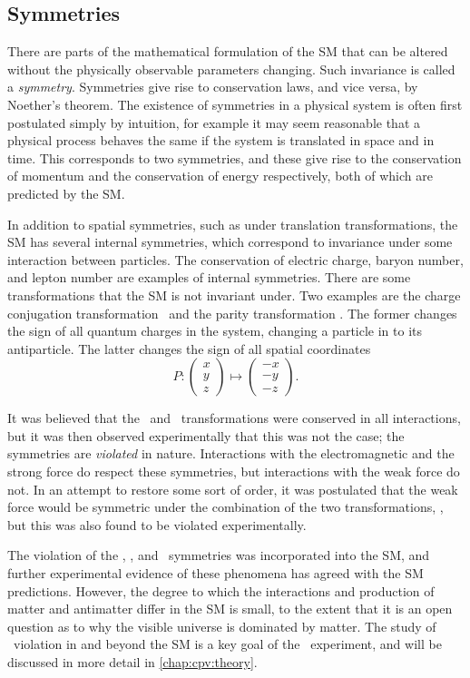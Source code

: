 \subsection{Symmetries}

There are parts of the mathematical formulation of the \ac{SM} that can be 
altered without the physically observable parameters changing.
Such invariance is called a \emph{symmetry}.
Symmetries give rise to conservation laws, and vice versa, by Noether's 
theorem.
The existence of symmetries in a physical system is often first postulated 
simply by intuition, for example it may seem reasonable that a physical process 
behaves the same if the system is translated in space and in time.
This corresponds to two symmetries, and these give rise to the conservation of 
momentum and the conservation of energy respectively, both of which are 
predicted by the \ac{SM}.

In addition to spatial symmetries, such as under translation transformations, 
the \ac{SM} has several internal symmetries, which correspond to invariance 
under some interaction between particles.
The conservation of electric charge, baryon number, and lepton number are 
examples of internal symmetries.
There are some transformations that the \ac{SM} is not invariant under.
Two examples are the charge conjugation transformation \Ctransform\ and the 
parity transformation \Ptransform.
The former changes the sign of all quantum charges in the system, changing a 
particle in to its antiparticle.
The latter changes the sign of all spatial coordinates
\begin{equation}
  P: \begin{pmatrix}x\\y\\z\end{pmatrix}
     \mapsto \begin{pmatrix}-x\\-y\\-z\end{pmatrix}.
  \label{eqn:intro:sm:parity}
\end{equation}

It was believed that the \Ctransform\ and \Ptransform\ transformations were 
conserved in all interactions, but it was then observed experimentally that 
this was not the case; the symmetries are \emph{violated} in nature.
Interactions with the electromagnetic and the strong force do respect these 
symmetries, but interactions with the weak force do not.
In an attempt to restore some sort of order, it was postulated that the weak 
force would be symmetric under the combination of the two transformations, \CP, 
but this was also found to be violated experimentally.

The violation of the \Ctransform, \Ptransform, and \CP\ symmetries was 
incorporated into the \ac{SM}, and further experimental evidence of these 
phenomena has agreed with the \ac{SM} predictions.
However, the degree to which the interactions and production of matter and 
antimatter differ in the \ac{SM} is small, to the extent that it is an open 
question as to why the visible universe is dominated by matter.
The study of \CP\ violation in and beyond the \ac{SM} is a key goal of the 
\lhcb\ experiment, and will be discussed in more detail in 
\cref{chap:cpv:theory}.
